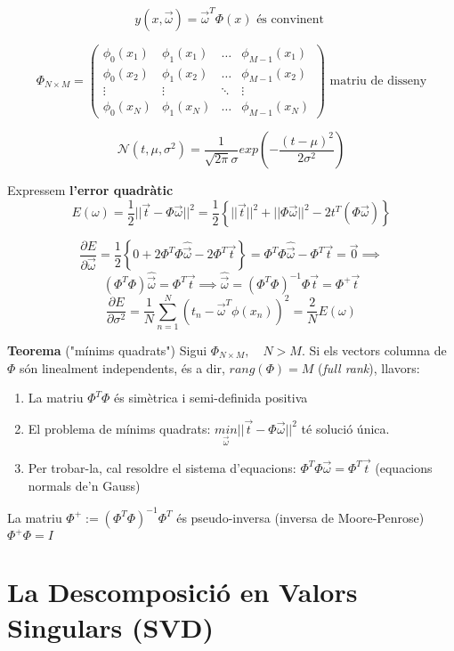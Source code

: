 \documentclass[a4paper]{article}
\begin{document}
$$
\boxed{y(x, \vec{\omega}) = \vec{\omega}^T \Phi(x)} \text{ és convinent }
$$

$$
\Phi_{N \times M} =
\begin{pmatrix}
\phi_0 (x_1) & \phi_1(x_1) & \ldots & \phi_{M-1} (x_1) \\
\phi_0 (x_2) & \phi_1(x_2) & \ldots & \phi_{M-1} (x_2) \\
\vdots & \vdots & \ddots & \vdots \\
\phi_0 (x_N) & \phi_1(x_N) & \ldots & \phi_{M-1} (x_N)
\end{pmatrix}
\text{ matriu de disseny}
$$

$$
\mathcal{N}(t, \mu, \sigma^2) = \frac{1}{\sqrt{2 \pi} \sigma} exp \left( - \frac{(t - \mu)^2}{2\sigma^2} \right)
$$

Expressem \textbf{l'error quadràtic}
$$
E(\omega) = \frac{1}{2} || \vec{t} - \Phi \vec{\omega} ||^2 = \frac{1}{2} \left\{ ||\vec{t}||^2 + ||\Phi \vec{\omega}||^2 - 2t^T(\Phi \vec{\omega}) \right\}
$$

$$
\frac{\partial E}{\partial \vec{\omega}} = \frac{1}{2} \left\{ 0 + 2 \Phi^T \Phi \hat{\vec{\omega}} - 2 \Phi^T \vec{t} \right\} = \Phi^T \Phi \hat{\vec{\omega}} - \Phi^T \vec{t} = \vec{0} \implies
$$
$$
\left( \Phi^T \Phi \right) \hat{\vec{\omega}} = \Phi^T \vec{t} \implies
\boxed{\hat{\vec{\omega}} = (\Phi^T \Phi)^{-1} \Phi \vec{t}} = \Phi^+ \vec{t}
$$
$$
\frac{\partial E}{\partial \sigma^2} = \frac{1}{N} \sum_{n=1}^N (t_n - \vec{\omega}^T \phi(x_n))^2 = \frac{2}{N} E(\omega)
$$

\textbf{Teorema} ("mínims quadrats")
Sigui $\Phi_{N\times M}, \quad N > M$. Si els vectors columna de $\Phi$ són linealment independents, és a dir, $rang(\Phi) = M$ (\emph{full rank}), llavors:

\begin{enumerate}
	\item La matriu $\Phi^T\Phi$ és simètrica i semi-definida positiva
	\item El problema de mínims quadrats: 
	$\underset{\vec{\omega}}{min} ||\vec{t} - \Phi \vec{\omega}||^2$ té solució única.
	\item Per trobar-la, cal resoldre el sistema d'equacions: $\Phi^T\Phi \vec{\omega} = \Phi^T \vec{t}$ (equacions normals de'n Gauss)
\end{enumerate}

La matriu $ \Phi^+ := \left( \Phi^T \Phi \right)^{-1} \Phi^T $ és pseudo-inversa (inversa de Moore-Penrose) $ \Phi^+ \Phi = I $

\section{La Descomposició en Valors Singulars (SVD)}
\end{document}
